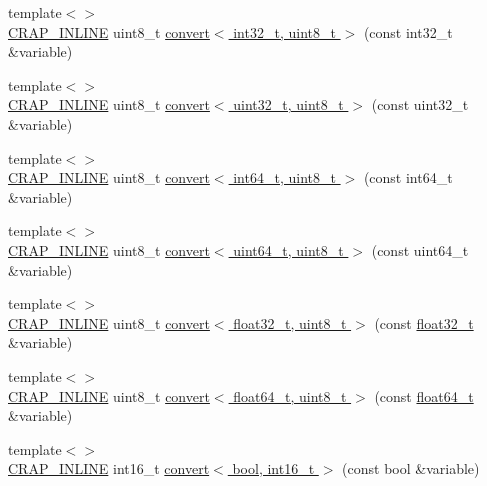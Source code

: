 \begin{DoxyCompactItemize}
\item 
{\footnotesize template$<$$>$ }\\\hyperlink{config__x86_8h_a5a40526b8d842e7ff731509998bb0f1c}{C\+R\+A\+P\+\_\+\+I\+N\+L\+I\+N\+E} uint8\+\_\+t \hyperlink{namespacecrap_a7bf2ca74b9a25ac0fff83d73ef210bad}{convert$<$ int32\+\_\+t, uint8\+\_\+t $>$} (const int32\+\_\+t \&variable)
\item 
{\footnotesize template$<$$>$ }\\\hyperlink{config__x86_8h_a5a40526b8d842e7ff731509998bb0f1c}{C\+R\+A\+P\+\_\+\+I\+N\+L\+I\+N\+E} uint8\+\_\+t \hyperlink{namespacecrap_a8a30e9eaae2d141ce3d7f781317d3e80}{convert$<$ uint32\+\_\+t, uint8\+\_\+t $>$} (const uint32\+\_\+t \&variable)
\item 
{\footnotesize template$<$$>$ }\\\hyperlink{config__x86_8h_a5a40526b8d842e7ff731509998bb0f1c}{C\+R\+A\+P\+\_\+\+I\+N\+L\+I\+N\+E} uint8\+\_\+t \hyperlink{namespacecrap_ad80e6334907104f1c991228799801d70}{convert$<$ int64\+\_\+t, uint8\+\_\+t $>$} (const int64\+\_\+t \&variable)
\item 
{\footnotesize template$<$$>$ }\\\hyperlink{config__x86_8h_a5a40526b8d842e7ff731509998bb0f1c}{C\+R\+A\+P\+\_\+\+I\+N\+L\+I\+N\+E} uint8\+\_\+t \hyperlink{namespacecrap_a92390f52f832a03334160602cb028b8d}{convert$<$ uint64\+\_\+t, uint8\+\_\+t $>$} (const uint64\+\_\+t \&variable)
\item 
{\footnotesize template$<$$>$ }\\\hyperlink{config__x86_8h_a5a40526b8d842e7ff731509998bb0f1c}{C\+R\+A\+P\+\_\+\+I\+N\+L\+I\+N\+E} uint8\+\_\+t \hyperlink{namespacecrap_aadae3aa46ae252afa2c519085f565ceb}{convert$<$ float32\+\_\+t, uint8\+\_\+t $>$} (const \hyperlink{crap__types_8h_a4611b605e45ab401f02cab15c5e38715}{float32\+\_\+t} \&variable)
\item 
{\footnotesize template$<$$>$ }\\\hyperlink{config__x86_8h_a5a40526b8d842e7ff731509998bb0f1c}{C\+R\+A\+P\+\_\+\+I\+N\+L\+I\+N\+E} uint8\+\_\+t \hyperlink{namespacecrap_a32684fe93a23dda153d5a9179e96333f}{convert$<$ float64\+\_\+t, uint8\+\_\+t $>$} (const \hyperlink{crap__types_8h_ac55f3ae81b5bc9053760baacf57e47f4}{float64\+\_\+t} \&variable)
\item 
{\footnotesize template$<$$>$ }\\\hyperlink{config__x86_8h_a5a40526b8d842e7ff731509998bb0f1c}{C\+R\+A\+P\+\_\+\+I\+N\+L\+I\+N\+E} int16\+\_\+t \hyperlink{namespacecrap_a7b25157df368bc353d22ad493be99d5a}{convert$<$ bool, int16\+\_\+t $>$} (const bool \&variable)

\end{DoxyCompactItemize}
